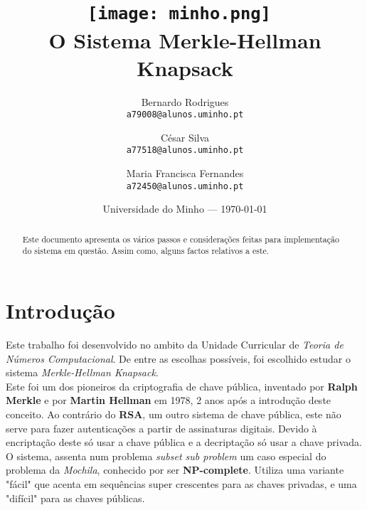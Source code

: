 \documentclass[11pt, language=portuguese]{report}
\begin{document}
\title{\texttt{[image: minho.png]}~\\[1cm] O Sistema Merkle-Hellman Knapsack}

\author{Bernardo Rodrigues\\ \texttt{a79008@alunos.uminho.pt}\\ \and César Silva\\ \texttt{a77518@alunos.uminho.pt}\\ \and Maria Francisca Fernandes\\ \texttt{a72450@alunos.uminho.pt}\\}

\date{Universidade do Minho --- \today}

\maketitle

\begin{abstract}

	Este documento apresenta os vários passos e considerações feitas para implementação do sistema em questão. Assim como, alguns factos relativos a este.


\end{abstract}

\tableofcontents

\listofalgorithms

\chapter{Introdução}

Este trabalho foi desenvolvido no ambito da Unidade Curricular de \textit{Teoria de Números Computacional}. De entre as escolhas possíveis, foi escolhido estudar o sistema \textit{Merkle-Hellman Knapsack}. \\
Este foi um dos pioneiros da criptografia de chave pública, inventado por \textbf{Ralph Merkle} e por \textbf{Martin Hellman} em 1978, 2 anos após a introdução deste conceito.
Ao contrário do \textbf{RSA}, um outro sistema de chave pública, este não serve para fazer autenticações a partir de assinaturas digitais. Devido à encriptação deste só usar a chave pública e a decriptação só usar a chave privada.
O sistema, assenta num problema \textit{subset sub problem} um caso especial do problema da \textit{Mochila}, conhecido por ser \textbf{NP-complete}. Utiliza uma variante "fácil" que acenta em sequências super crescentes para as chaves privadas, e uma "difícil" para as chaves públicas.
\end{document}
